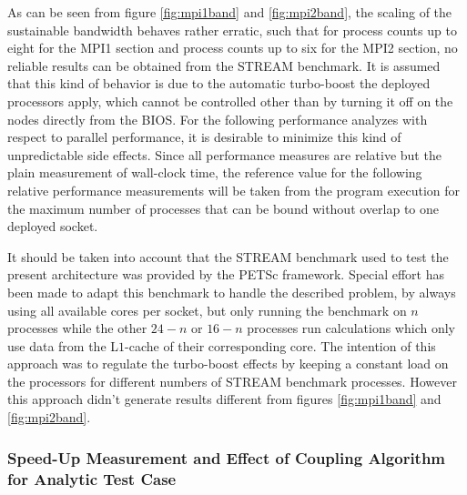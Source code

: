 As can be seen from figure \ref{fig:mpi1band} and \ref{fig:mpi2band}, the scaling of the sustainable bandwidth behaves rather erratic, such that for process counts up to eight for the MPI1 section and process counts up to six for the MPI2 section, no reliable results can be obtained from the STREAM benchmark. It is assumed that this kind of behavior is due to the automatic turbo-boost the deployed processors apply, which cannot be controlled other than by turning it off on the nodes directly from the BIOS. For the following performance analyzes with respect to parallel performance, it is desirable to minimize this kind of unpredictable side effects. Since all performance measures are relative but the plain measurement of wall-clock time, the reference value for the following relative performance measurements will be taken from the program execution for the maximum number of processes that can be bound without overlap to one deployed socket.

It should be taken into account that the STREAM benchmark used to test the present architecture was provided by the PETSc framework. Special effort has been made to adapt this benchmark to handle the described problem, by always using all available cores per socket, but only running the benchmark on \(n\) processes while the other \(24 - n\) or \(16 - n\) processes run calculations which only use data from the L\(1\)-cache of their corresponding core. The intention of this approach was to regulate the turbo-boost effects by keeping a constant load on the processors for different numbers of STREAM benchmark processes. However this approach didn't generate results different from figures \ref{fig:mpi1band} and \ref{fig:mpi2band}.

\subsubsection{Speed-Up Measurement and Effect of Coupling Algorithm for Analytic Test Case}
\label{sec:speedup}

